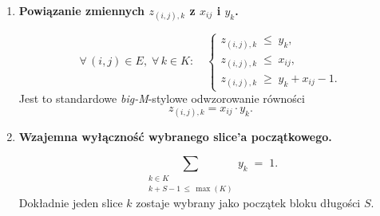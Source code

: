 \documentclass[12pt]{article}
\begin{document}
\begin{enumerate}
	      \vspace{1em}

	\item \textbf{Powiązanie zmiennych \(z_{(i,j),k}\) z \(x_{ij}\) i \(y_k\).}

	      \[
		      \forall\,(i,j)\in E,\;\forall\,k \in K:\quad
		      \begin{cases}
			      z_{(i,j),k} \;\le\; y_k,    \\
			      z_{(i,j),k} \;\le\; x_{ij}, \\
			      z_{(i,j),k} \;\ge\; y_k + x_{ij} - 1.
		      \end{cases}
	      \]
	      Jest to standardowe \emph{big-M}-stylowe odwzorowanie równości
	      \[
		      z_{(i,j),k} = x_{ij} \cdot y_k.
	      \]

	      \vspace{1em}

	\item \textbf{Wzajemna wyłączność wybranego slice'a początkowego.}

	      \[
		      \sum_{\substack{k \in K \\ k + S - 1 \,\le\, \max(K)}}
		      y_k
		      \;=\; 1.
	      \]
	      Dokładnie jeden slice \(k\) zostaje wybrany jako początek bloku długości \(S\).

\end{enumerate}
\end{document}
